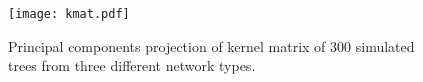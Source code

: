 \documentclass{article}
\begin{document}
\begin{figure}
    \centering
    \texttt{[image: kmat.pdf]}
    \label{fig:kmat}
    \caption{Principal components projection of kernel matrix of 300 simulated
    trees from three different network types.}
\end{figure}
\printbibliography
\end{document}
